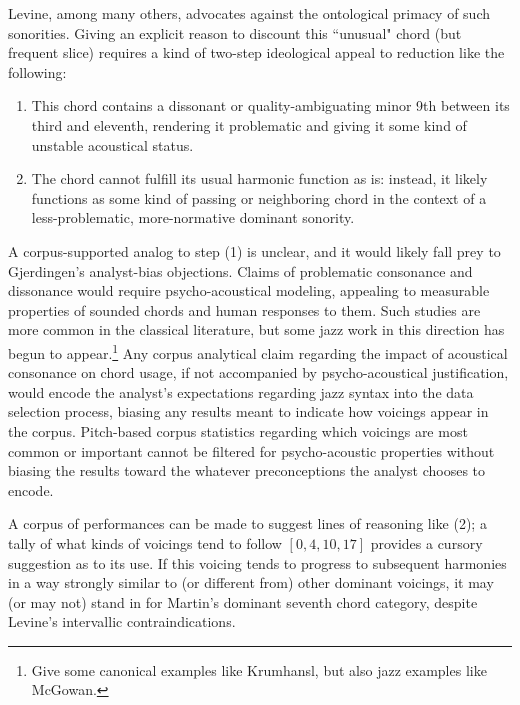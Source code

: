 Levine, among many others, advocates against the ontological primacy of such sonorities.  Giving an explicit reason to discount this ``unusual" chord (but frequent slice) requires a kind of two-step ideological appeal to reduction like the following:
\begin{enumerate}
	\item This chord contains a dissonant or quality-ambiguating minor 9th between its third and eleventh, rendering it problematic and giving it some kind of unstable acoustical status.
	\item The chord cannot fulfill its usual harmonic function as is: instead, it likely functions as some kind of passing or neighboring chord in the context of a less-problematic, more-normative dominant sonority.
\end{enumerate}
A corpus-supported analog to step (1) is unclear, and it would likely fall prey to Gjerdingen's analyst-bias objections.  Claims of problematic consonance and dissonance would require psycho-acoustical modeling, appealing to measurable properties of sounded chords and human responses to them.  Such studies are more common in the classical literature, but some jazz work in this direction has begun to appear.\footnote{Give some canonical examples like Krumhansl, but also jazz examples  like McGowan.}  Any corpus analytical claim regarding the impact of acoustical consonance on chord usage, if not accompanied by psycho-acoustical justification, would encode the analyst's expectations regarding jazz syntax into the data selection process, biasing any results meant to indicate how voicings appear in the corpus.  Pitch-based corpus statistics regarding which voicings are most common or important cannot be filtered for psycho-acoustic properties without biasing the results toward the whatever preconceptions the analyst chooses to encode.

A corpus of performances can be made to suggest lines of reasoning like (2); a tally of what kinds of voicings tend to follow $[0,4,10,17]$ provides a cursory suggestion as to its use.  If this voicing tends to progress to subsequent harmonies in a way strongly similar to (or different from) other dominant voicings, it may (or may not) stand in for Martin's dominant seventh chord category, despite Levine's intervallic contraindications.

